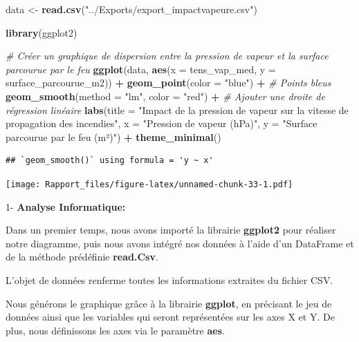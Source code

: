 \documentclass[
]{article}
\newenvironment{Shaded}{\begin{snugshade}}{\end{snugshade}}
\newcommand{\AttributeTok}[1]{\textcolor[rgb]{0.13,0.29,0.53}{#1}}
\newcommand{\CommentTok}[1]{\textcolor[rgb]{0.56,0.35,0.01}{\textit{#1}}}
\newcommand{\FunctionTok}[1]{\textcolor[rgb]{0.13,0.29,0.53}{\textbf{#1}}}
\newcommand{\NormalTok}[1]{#1}
\newcommand{\OtherTok}[1]{\textcolor[rgb]{0.56,0.35,0.01}{#1}}
\newcommand{\SpecialCharTok}[1]{\textcolor[rgb]{0.81,0.36,0.00}{\textbf{#1}}}
\newcommand{\StringTok}[1]{\textcolor[rgb]{0.31,0.60,0.02}{#1}}
\begin{document}
\begin{Shaded}
\begin{Highlighting}[]
\NormalTok{data }\OtherTok{\textless{}{-}} \FunctionTok{read.csv}\NormalTok{(}\StringTok{"../Exports/export\_impactvapeure.csv"}\NormalTok{)}

\FunctionTok{library}\NormalTok{(ggplot2)}

\CommentTok{\# Créer un graphique de dispersion entre la pression de vapeur et la surface parcourue par le feu}
\FunctionTok{ggplot}\NormalTok{(data, }\FunctionTok{aes}\NormalTok{(}\AttributeTok{x =}\NormalTok{ tens\_vap\_med, }\AttributeTok{y =}\NormalTok{ surface\_parcourue\_m2)) }\SpecialCharTok{+}
  \FunctionTok{geom\_point}\NormalTok{(}\AttributeTok{color =} \StringTok{"blue"}\NormalTok{) }\SpecialCharTok{+}  \CommentTok{\# Points bleus}
  \FunctionTok{geom\_smooth}\NormalTok{(}\AttributeTok{method =} \StringTok{"lm"}\NormalTok{, }\AttributeTok{color =} \StringTok{"red"}\NormalTok{) }\SpecialCharTok{+}  \CommentTok{\# Ajouter une droite de régression linéaire}
  \FunctionTok{labs}\NormalTok{(}\AttributeTok{title =} \StringTok{"Impact de la pression de vapeur sur la vitesse de propagation des incendies"}\NormalTok{,}
       \AttributeTok{x =} \StringTok{"Pression de vapeur (hPa)"}\NormalTok{,}
       \AttributeTok{y =} \StringTok{"Surface parcourue par le feu (m²)"}\NormalTok{) }\SpecialCharTok{+}
  \FunctionTok{theme\_minimal}\NormalTok{()}
\end{Highlighting}
\end{Shaded}

\begin{verbatim}
## `geom_smooth()` using formula = 'y ~ x'
\end{verbatim}

\texttt{[image: Rapport\_files/figure-latex/unnamed-chunk-33-1.pdf]}

1- \textbf{Analyse Informatique:}

Dans un premier temps, nous avons importé la librairie \textbf{ggplot2}
pour réaliser notre diagramme, puis nous avons intégré nos données à
l'aide d'un DataFrame et de la méthode prédéfinie \textbf{read.Csv}.

L'objet de données renferme toutes les informations extraites du fichier
CSV.

Nous générons le graphique grâce à la librairie \textbf{ggplot}, en
précisant le jeu de données ainsi que les variables qui seront
représentées sur les axes X et Y. De plus, nous définissons les axes via
le paramètre \textbf{aes}.
\end{document}
